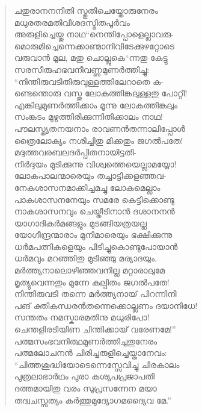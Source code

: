 \begin{verse}
ചതുരാനനനിതി സ്തുതിചെയ്തോരുനേരം\\
മധുരതരമതിവിശദസ്മിതപൂര്‍വം\\
അരുളിച്ചെയ്തു നാഥ“നെന്തിപ്പോളെല്ലാവരു-\\
മൊരുമിച്ചെന്നെക്കാണ്മാനിവിടേക്കുഴറ്റോടെ\\
വരുവാന്‍ മൂല, മതു ചൊല്ലുകെ“ന്നതു കേട്ടു\\
സരസീരുഹഭവനീവണ്ണമുണര്‍ത്തിച്ചു:\\
“നിന്തിരുവടിതിരുവുള്ളത്തിലേറാതെ ക-\\
ണ്ടെന്തൊരു വസ്തു ലോകത്തിങ്കലുള്ളതു പോറ്റീ!\\
എങ്കിലുമുണര്‍ത്തിക്കാം മൂന്നു ലോകത്തിങ്കലും\\
സംങ്കടം മുഴുത്തിരിക്കുന്നിതിക്കാലം നാഥ!\\
പൗലസ്ത്യതനയനാം രാവണന്‍തന്നാലിപ്പോള്‍\\
ത്രൈലോക്യം നശിച്ചിതു മിക്കതും ജഗല്‍പതേ!\\
മദ്ദത്തവരബലദര്‍പ്പിതനായിട്ടതി-\\
നിര്‍ദ്ദയം മുടിക്കുന്നു വിശ്വത്തെയെല്ലാമയ്യോ!\\
ലോകപാലന്മാരെയും തച്ചാട്ടിക്കളഞ്ഞവ-\\
നേകശാസനമാക്കിച്ചമച്ചു ലോകമെല്ലാം\\
പാകശാസനനേയും സമരേ കെട്ടിക്കൊണ്ടു\\
നാകശാസനവും ചെയ്തീടിനാന്‍ ദശാനനന്‍\\
യാഗാദികര്‍മങ്ങളും മുടങ്ങിയത്രയല്ല\\
യോഗീന്ദ്രന്മാരാം മുനിമാരെയും ഭക്ഷിക്കുന്നു\\
ധര്‍മപത്നികളെയും പിടിച്ചുകൊണ്ടുപോയാന്‍\\
ധര്‍മവും മറഞ്ഞിതു മുടിഞ്ഞു മര്യാദയും.\\
മര്‍ത്ത്യനാലൊഴിഞ്ഞവനില്ല മറ്റാരാലുമേ\\
മൃത്യുവെന്നതും മുന്നേ കല്പിതം ജഗല്‍പതേ!\\
നിന്തിരുവടി തന്നെ മര്‍ത്ത്യനായ് പിറന്നിനി\\
പങ് ക്തികന്ധരന്‍തന്നെക്കൊല്ലണം ദയാനിധേ!\\
സന്തതം നമസ്കാരമതിനു മധുരിപോ!\\
ചെന്തളിരടിയിണ ചിന്തിക്കായ് വരേണമേ!”\\
പത്മസംഭവനിത്ഥമുണര്‍ത്തിച്ചതുനേരം\\
പത്മലോചനന്‍ ചിരിച്ചരുളിച്ചെയ്താനേവം:\\
“ചിത്തശുദ്ധിയോടെന്നെസ്സേവിച്ചു ചിരകാലം\\
പുത്രലാഭാര്‍ഥം പുരാ കശ്യപപ്രജാപതി\\
ദത്തമായിതു വരം സുപ്രസന്നേന മയാ\\
തദ്വചസ്സത്യം കര്‍ത്തുമുദ്യോഗമദ്യൈവ മേ.”\\

\end{verse}
